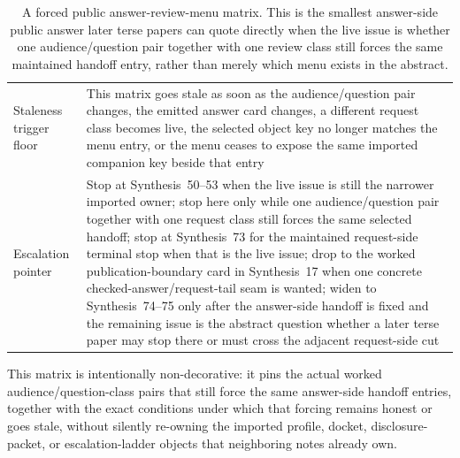 \documentclass[11pt]{article}
\begin{document}
\begin{table}[t]
\begin{tabularx}{\linewidth}{@{}lX@{}}
Staleness trigger floor & This matrix goes stale as soon as the audience/question pair changes, the emitted answer card changes, a different request class becomes live, the selected object key no longer matches the menu entry, or the menu ceases to expose the same imported companion key beside that entry \\
Escalation pointer & Stop at Synthesis~50--53 when the live issue is still the narrower imported owner; stop here only while one audience/question pair together with one request class still forces the same selected handoff; stop at Synthesis~73 for the maintained request-side terminal stop when that is the live issue; drop to the worked publication-boundary card in Synthesis~17 when one concrete checked-answer/request-tail seam is wanted; widen to Synthesis~74--75 only after the answer-side handoff is fixed and the remaining issue is the abstract question whether a later terse paper may stop there or must cross the adjacent request-side cut \\
\bottomrule
\end{tabularx}
\caption{A forced public answer-review-menu matrix. This is the smallest answer-side public answer later terse papers can quote directly when the live issue is whether one audience/question pair together with one review class still forces the same maintained handoff entry, rather than merely which menu exists in the abstract.}
\label{tab:forced-public-answer-review-menu-matrix}
\end{table}

This matrix is intentionally non-decorative: it pins the actual worked audience/question-class pairs that still force the same answer-side handoff entries, together with the exact conditions under which that forcing remains honest or goes stale, without silently re-owning the imported profile, docket, disclosure-packet, or escalation-ladder objects that neighboring notes already own.\cite{series:workedexample}
\end{document}

